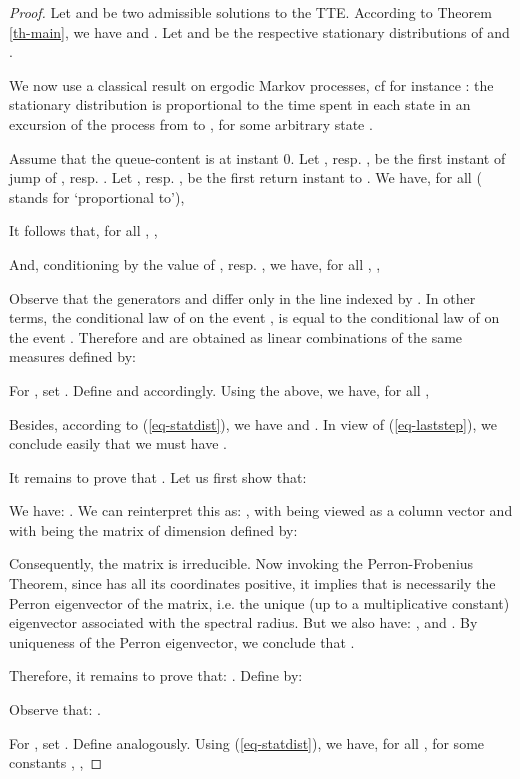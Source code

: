 \documentclass[11pt,a4paper]{article}
\theoremstyle{remark}
\def\eref#1{(\ref{#1})}
\begin{document}
\begin{proof}
Let  and 
be two admissible solutions to the TTE.
According to Theorem
\ref{th-main}, we have  and .
Let  and  be the respective stationary distributions
of  and .

We now use a classical result on
ergodic Markov processes, cf for instance \cite[Chapter
  8, Theorem 5.1]{brem99}: the stationary distribution
is proportional to the time spent in each state in an excursion of the
process from  to , for some arbitrary state .

Assume that the queue-content is  at instant 0. Let ,
resp. , be the first instant of jump of ,
resp. .  Let , resp. , be the first
return instant to .
We have, for all  ( stands for
`proportional to'),

It follows that, for all , ,

And, conditioning by the value of ,
resp. , we have, for all , ,


Observe that the generators  and  differ only in
the line indexed by . In other terms, the conditional law of  on the event , is equal to the conditional law of  on the event .
Therefore  and  are obtained as linear combinations
of the same measures  defined by:

For , set . Define  and  accordingly.
Using the above, we have, for all ,

Besides, according to \eref{eq-statdist}, we have  and . In view of
\eref{eq-laststep}, we conclude easily that we must have
.

It remains to prove that .
Let us first show that:

We have: . We can reinterpret this
as: , with  being viewed as a column vector and with 
being the matrix of dimension  defined by:

 Consequently, the 
matrix  is irreducible. 
Now invoking the Perron-Frobenius Theorem, since  has all its
coordinates positive, it implies that  is necessarily the
Perron eigenvector of the matrix, i.e. the unique (up to a
multiplicative constant) eigenvector associated with the spectral
radius. But we also have: , and . By uniqueness of the Perron
eigenvector, we conclude that .

\medskip

Therefore, it remains to prove that: .
Define  by:

Observe that: .

For , set . Define  analogously. Using
\eref{eq-statdist}, we have, for all , for some
constants , ,


\end{proof}
\end{document}
